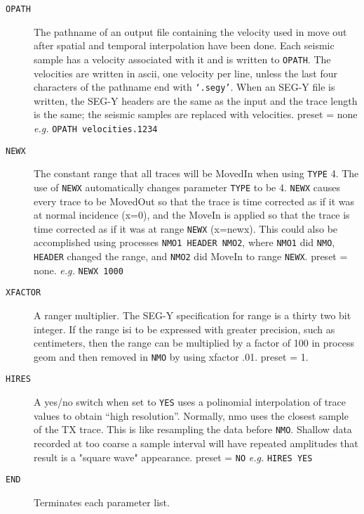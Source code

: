 \begin{description}
\item[\texttt{OPATH}] The pathname of an output file containing the velocity used in
         move out after spatial and temporal interpolation have been
         done.  Each seismic sample has a velocity associated with it
         and is written to \texttt{OPATH}.  The velocities are written in \gls{ascii},
         one velocity per line, unless the last four characters of the
         pathname end with \texttt{`.segy'}.  When an SEG-Y file is written, the
         SEG-Y headers are the same as the input and the trace length
         is the same; the seismic samples are replaced with velocities.
         \Gls{preset} = none  \textit{e.g.}  \texttt{OPATH velocities.1234}

\item[\texttt{NEWX}] The constant range that all traces will be MovedIn when using
         \texttt{TYPE} 4.  The use of \texttt{NEWX} automatically changes parameter \texttt{TYPE}
         to be 4.  \texttt{NEWX} causes every trace to be MovedOut so that the
         trace is time corrected as if it was at normal incidence (x=0),
         and the MoveIn is applied so that the trace is time corrected
         as if it was at range \texttt{NEWX} (x=newx).  This could also be
         accomplished using processes \texttt{NMO1 HEADER NMO2}, where \texttt{NMO1} did
         \texttt{NMO}, \texttt{HEADER} changed the range, and \texttt{NMO2} did MoveIn to range
         \texttt{NEWX}.
         \Gls{preset} = none.   \textit{e.g.}   \texttt{NEWX 1000}

\item[\texttt{XFACTOR}] A ranger multiplier.  The SEG-Y specification for range is a
        thirty two bit integer.  If the range isi to be expressed
        with greater precision, such as centimeters, then the range
        can be multiplied by a factor of 100 in process geom and then
        removed in \texttt{NMO} by using xfactor .01.
        \Gls{preset} = 1.

\item[\texttt{HIRES}] A yes/no switch when set to \texttt{YES} uses a polinomial interpolation
        of trace values to obtain ``high resolution''.  Normally, nmo uses
        the closest sample of the TX trace.  This is like resampling the
        data before \texttt{NMO}.  Shallow data recorded at too coarse a sample
        interval will have repeated amplitudes that result is a "square
        wave" appearance.
        \Gls{preset} = \texttt{NO}             \textit{e.g.}  \texttt{HIRES YES}

\item[\texttt{END}] Terminates each parameter list.
\end{description}

